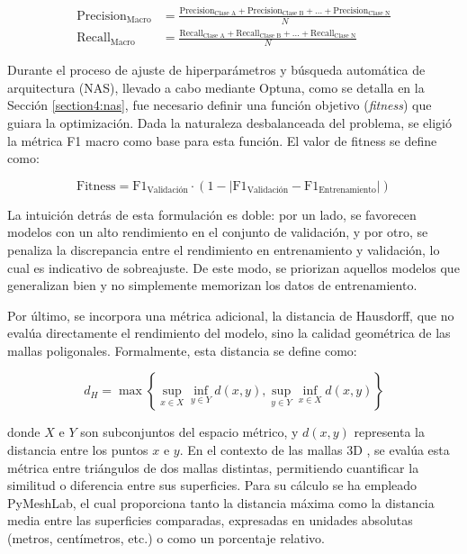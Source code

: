 \begin{align}
    \text{Precision}_{\text{Macro}} &= \frac{\text{Precision}_{\text{Clase A}}+\text{Precision}_{\text{Clase B}}+\dots+\text{Precision}_{\text{Clase N}}}{N} \\
    \text{Recall}_{\text{Macro}} &= \frac{\text{Recall}_{\text{Clase A}}+\text{Recall}_{\text{Clase B}}+\dots+\text{Recall}_{\text{Clase N}}}{N}
\end{align}

Durante el proceso de ajuste de hiperparámetros y búsqueda automática de arquitectura (NAS), llevado a cabo mediante Optuna, como se detalla en la Sección \ref{section4:nas}, fue necesario definir una función objetivo (\textit{fitness}) que guiara la optimización. Dada la naturaleza desbalanceada del problema, se eligió la métrica F1 macro como base para esta función. El valor de fitness se define como:

\begin{equation}
    \text{Fitness} = \text{F1}_{\text{Validación}} \cdot (1 - | \text{F1}_{\text{Validación}} -  \text{F1}_{\text{Entrenamiento}}|)
\end{equation}

La intuición detrás de esta formulación es doble: por un lado, se favorecen modelos con un alto rendimiento en el conjunto de validación, y por otro, se penaliza la discrepancia entre el rendimiento en entrenamiento y validación, lo cual es indicativo de sobreajuste. De este modo, se priorizan aquellos modelos que generalizan bien y no simplemente memorizan los datos de entrenamiento.

Por último, se incorpora una métrica adicional, la distancia de Hausdorff, que no evalúa directamente el rendimiento del modelo, sino la calidad geométrica de las mallas poligonales. Formalmente, esta distancia se define como:

\begin{equation}
d_H = \max\left\{\sup_{x\in X} \inf_{y \in Y} d(x,y), \sup_{y\in Y} \inf_{x \in X} d(x,y) \right\}
\end{equation}

donde $X$ e $Y$ son subconjuntos del espacio métrico, y $d(x,y)$ representa la distancia entre los puntos $x$ e $y$. En el contexto de las mallas 3D \cite{cignoni1998metro}, se evalúa esta métrica entre triángulos de dos mallas distintas, permitiendo cuantificar la similitud o diferencia entre sus superficies. Para su cálculo se ha empleado PyMeshLab, el cual proporciona tanto la distancia máxima como la distancia media entre las superficies comparadas, expresadas en unidades absolutas (metros, centímetros, etc.) o como un porcentaje relativo.

